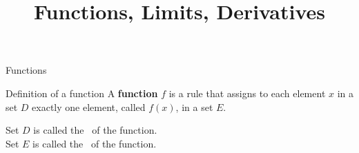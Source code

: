 \documentclass{beamer}
\begin{document}

\title{Functions, Limits, Derivatives}
\author{}
\date{}

\begin{frame}
  \titlepage
\end{frame}

\begin{frame}[t]{Functions}\vspace{4pt}
  \begin{block}{Definition of a function}
    \vspace{4pt}
    A \textbf{function} $f$ is a rule that assigns to each element $x$ in a set $D$ exactly one element, called $f(x)$, in a set $E$.
    \vspace{4pt}
  \end{block}

  Set $D$ is called the
  \, of the function.\\[10pt]
  Set $E$ is called the
  \, of the function.
\end{frame}
\end{document}
